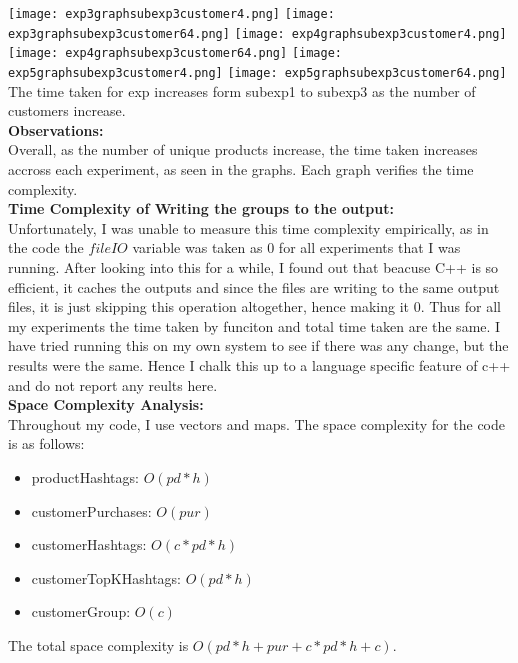 \documentclass[12pt]{article}
\begin{document}
\texttt{[image: exp3graphsubexp3customer4.png]}
\texttt{[image: exp3graphsubexp3customer64.png]}
\texttt{[image: exp4graphsubexp3customer4.png]}
\texttt{[image: exp4graphsubexp3customer64.png]}
\texttt{[image: exp5graphsubexp3customer4.png]}
\texttt{[image: exp5graphsubexp3customer64.png]}\\

The time taken for exp increases form subexp1 to subexp3 as the number of customers increase.\\

\textbf{Observations:}\\
Overall, as the number of unique products increase, the time taken increases accross each experiment, as seen in the graphs. Each graph verifies the time complexity.\\

\textbf{Time Complexity of Writing the groups to the output:}\\
Unfortunately, I was unable to measure this time complexity empirically, as in the code the $fileIO$ variable was taken as 0 for all experiments that I was running. After looking into this for a while, I found out that beacuse C++ is so efficient, it caches the outputs and since the files are writing to the same output files, it is just skipping this operation altogether, hence making it 0. Thus for all my experiments the time taken by funciton and total time taken are the same. I have tried running this on my own system to see if there was any change, but the results were the same. Hence I chalk this up to a language specific feature of c++ and do not report any reults here.\\

\textbf{Space Complexity Analysis:}\\
Throughout my code, I use vectors and maps. The space complexity for the code is as follows:
\begin{itemize}
    \item productHashtags: $O(pd*h)$
    \item customerPurchases: $O(pur)$
    \item customerHashtags: $O(c*pd*h)$
    \item customerTopKHashtags: $O(pd*h)$
    \item customerGroup: $O(c)$
\end{itemize}
The total space complexity is $O(pd*h + pur + c*pd*h + c)$.\\
\end{document}
